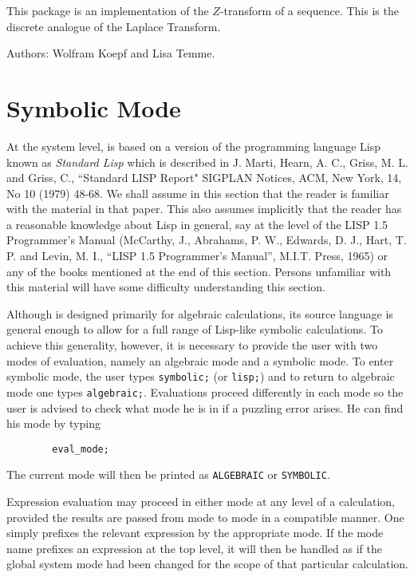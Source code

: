 This package is an implementation of the $Z$-transform of a sequence.
This is the discrete analogue of the Laplace Transform.

Authors: Wolfram Koepf and Lisa Temme.

\chapter{Symbolic Mode}

At the system level, {\REDUCE} is based on a version of the programming
language Lisp known as {\em Standard Lisp\/} which is described
in J. Marti, Hearn, A. C., Griss, M. L. and Griss, C., ``Standard LISP
Report" SIGPLAN Notices, ACM, New York, 14, No 10 (1979) 48-68.  We shall
assume in this section that the reader is familiar with the material in
that paper.  This also assumes implicitly that the reader has a reasonable
knowledge about Lisp in general, say at the level of the LISP 1.5
Programmer's Manual (McCarthy, J., Abrahams, P. W., Edwards, D. J., Hart,
T. P. and Levin, M. I., ``LISP 1.5 Programmer's Manual'', M.I.T.  Press,
1965) or any of the books mentioned at the end of this section.  Persons
unfamiliar with this material will have some difficulty understanding this
section.

Although {\REDUCE} is designed primarily for algebraic calculations, its
source language is general enough to allow for a full range of Lisp-like
symbolic calculations.  To achieve this generality, however, it is
necessary to provide the user with two modes of evaluation, namely an
algebraic mode and a symbolic mode. To enter symbolic mode, the user types {\tt symbolic;}
 (or {\tt lisp;}) and to return to
algebraic mode one types {\tt algebraic;}.
Evaluations proceed differently in each mode so the user is advised to
check what mode he is in if a puzzling error arises.  He can find his mode
by typing

\begin{verbatim}
        eval_mode;
\end{verbatim}
The current mode will then be printed as {\tt ALGEBRAIC} or {\tt SYMBOLIC}.

Expression evaluation may proceed in either mode at any level of a
calculation, provided the results are passed from mode to mode in a
compatible manner. One simply prefixes the relevant expression by the
appropriate mode. If the mode name prefixes an expression at the top
level, it will then be handled as if the global system mode had been
changed for the scope of that particular calculation.

